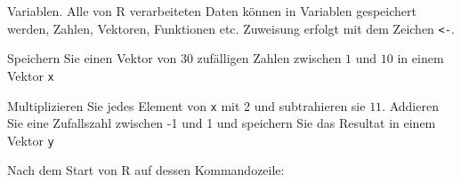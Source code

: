 Variablen. Alle von R verarbeiteten Daten können in Variablen
gespeichert werden, Zahlen, Vektoren, Funktionen etc. Zuweisung
erfolgt mit dem Zeichen {\tt <-}.
\begin{teilaufgaben}
\item
Speichern Sie einen Vektor
von 30 zufälligen Zahlen zwischen $1$ und $10$ in einem Vektor
{\tt x}
\item Multiplizieren Sie jedes Element von {\tt x} mit 2 und subtrahieren
sie $11$. Addieren Sie eine Zufallszahl zwischen -1 und 1 und speichern Sie
das Resultat in einem Vektor {\tt y}
\end{teilaufgaben}

\begin{loesung}
Nach dem Start von R auf dessen Kommandozeile:
\end{loesung}

